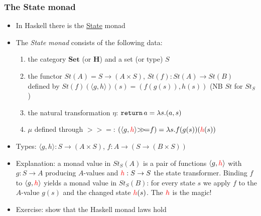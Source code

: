 \documentclass[handout]{beamer}
\newcommand{\bfsf}[1]{{\boldsymbol{#1}}}
\newcommand{\Set}{\bfsf{Set}}
\newcommand{\HH}{\bfsf{H}}
\newcommand{\Kp}[1]{{\langle #1 \rangle}}
\newcommand{\bind}{{>}\!\!{>}\!{=}}
\newcommand{\ttt}[1]{\text{\tt #1}}
\begin{document}
\frame
  {   
    \frametitle{The State monad}\label{Mon5:MonadState}

 \begin{itemize}[<+->]
\item In Haskell there is the 
\href{https://wiki.haskell.org/All_About_Monads\#The_State\_monad}%
{\color{blue}State} monad
\item The \emph{State monad} consists of the following data:
 \begin{enumerate}
    \item the category $\Set$ (or $\HH$) and a set (or type) $S$
    \item the functor $St(A) = S \to (A\times S)$, $St(f) : St(A)\to St(B)$ defined by
$St(f)(\Kp{g,h})(s) = (f(g(s)),h(s))$ (NB $St$ for $St_S$)%
    \item the natural transformation $\eta$: $\ttt{return}\,a = \lambda s. (a,s)$
    \item $\mu$ defined through $\bind$:
$(\Kp{g,{\color{red}h}} \bind f ) =  \lambda s. f(g(s))({\color{red}h}(s))$
 \end{enumerate}
\item Types: $\Kp{g,h}: S \to (A\times S)$, $f: A\to (S \to (B\times S))$ 
\item Explanation: a monad value in $St_S(A)$ is a pair of functions  $\Kp{g,{\color{red}h}}$
with $g:S\to A$ producing $A$-values and ${\color{red}h}:S\to S$ the state transformer.
Binding $f$ to $\Kp{g,{\color{red}h}}$ yields a monad value in $St_S(B)$:
for every state $s$ we apply $f$ to the $A$-value $g(s)$ and 
the changed state ${\color{red}h}(s)$. The ${\color{red}h}$ is the magic!
\item Exercise: show that the Haskell monad laws hold
 \end{itemize}

 }
\end{document}
